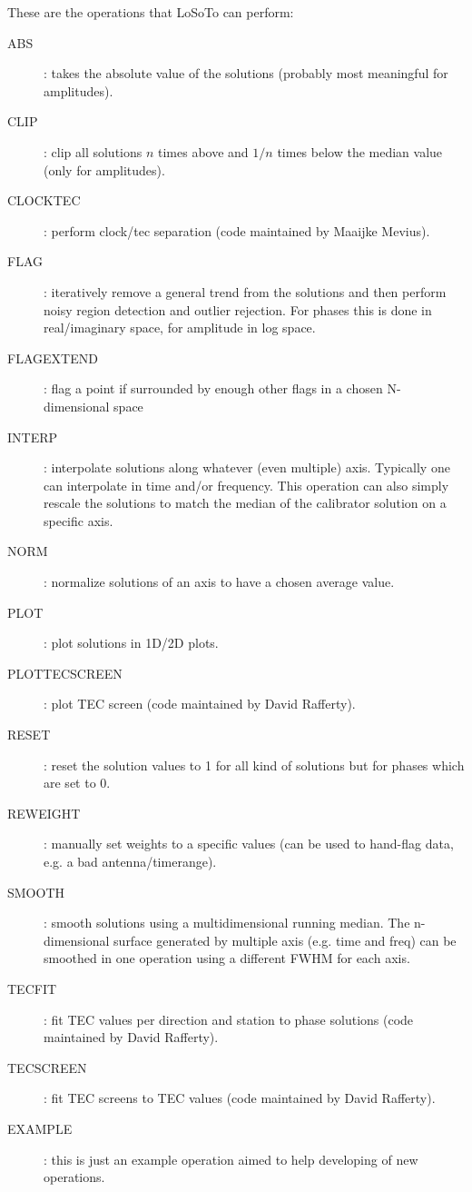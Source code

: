 \documentclass[]{article}
\def \losoto {LoSoTo}
\begin{document}
These are the operations that \losoto{} can perform:
\begin{description}
 \item[ABS]: takes the absolute value of the solutions (probably most meaningful for amplitudes).
 \item[CLIP]: clip all solutions $n$ times above and $1/n$ times below the median value (only for amplitudes).
 \item[CLOCKTEC]: perform clock/tec separation (code maintained by Maaijke Mevius).
 \item[FLAG]: iteratively remove a general trend from the solutions and then perform noisy region detection and outlier rejection. For phases this is done in real/imaginary space, for amplitude in log space.
 \item[FLAGEXTEND]: flag a point if surrounded by enough other flags in a chosen N-dimensional space
 \item[INTERP]: interpolate solutions along whatever (even multiple) axis. Typically one can interpolate in time and/or frequency. This operation can also simply rescale the solutions to match the median of the calibrator solution on a specific axis.
 \item[NORM]: normalize solutions of an axis to have a chosen average value.
 \item[PLOT]: plot solutions in 1D/2D plots.
 \item[PLOTTECSCREEN]: plot TEC screen (code maintained by David Rafferty).
 \item[RESET]: reset the solution values to 1 for all kind of solutions but for phases which are set to 0.
 \item[REWEIGHT]: manually set weights to a specific values (can be used to hand-flag data, e.g. a bad antenna/timerange).
 \item[SMOOTH]: smooth solutions using a multidimensional running median. The n-dimensional surface generated by multiple axis (e.g. time and freq) can be smoothed in one operation using a different FWHM for each axis.
 \item[TECFIT]: fit TEC values per direction and station to phase solutions (code maintained by David Rafferty).
 \item[TECSCREEN]: fit TEC screens to TEC values (code maintained by David Rafferty).
 \item[EXAMPLE]: this is just an example operation aimed to help developing of new operations.
\end{description}
\end{document}
